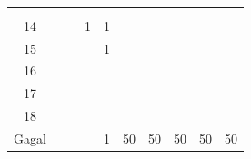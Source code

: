 \begin{minipage}[\minipagealign]{\minipagewidth}
{\begin{tabular}{|c|lllllllll|}
\multicolumn{1}{r|}{} & \\ \hline 14 & \multicolumn{1}{r|}{} & \multicolumn{1}{r|}{} & \multicolumn{1}{r|}{1} & \multicolumn{1}{r|}{1} & \multicolumn{1}{r|}{} & \multicolumn{1}{r|}{} & \multicolumn{1}{r|}{} & \multicolumn{1}{r|}{} & \\ \hline 15 & \multicolumn{1}{r|}{} & \multicolumn{1}{r|}{} & \multicolumn{1}{r|}{} & \multicolumn{1}{r|}{1} & \multicolumn{1}{r|}{} & \multicolumn{1}{r|}{} & \multicolumn{1}{r|}{} & \multicolumn{1}{r|}{} & \\ \hline 16 & \multicolumn{1}{r|}{} & \multicolumn{1}{r|}{} & \multicolumn{1}{r|}{} & \multicolumn{1}{r|}{} & \multicolumn{1}{r|}{} & \multicolumn{1}{r|}{} & \multicolumn{1}{r|}{} & \multicolumn{1}{r|}{} & \\ \hline 17 & \multicolumn{1}{r|}{} & \multicolumn{1}{r|}{} & \multicolumn{1}{r|}{} & \multicolumn{1}{r|}{} & \multicolumn{1}{r|}{} & \multicolumn{1}{r|}{} & \multicolumn{1}{r|}{} & \multicolumn{1}{r|}{} & \\ \hline 18 & \multicolumn{1}{r|}{} & \multicolumn{1}{r|}{} & \multicolumn{1}{r|}{} & \multicolumn{1}{r|}{} & \multicolumn{1}{r|}{} & \multicolumn{1}{r|}{} & \multicolumn{1}{r|}{} & \multicolumn{1}{r|}{} & \\ \hline Gagal & \multicolumn{1}{r|}{} & \multicolumn{1}{r|}{} & \multicolumn{1}{r|}{} & \multicolumn{1}{r|}{1} & \multicolumn{1}{r|}{50} & \multicolumn{1}{r|}{50} & \multicolumn{1}{r|}{50} & \multicolumn{1}{r|}{50} & 50 \\ \hline
		\end{tabular}
	}
\end{minipage}

